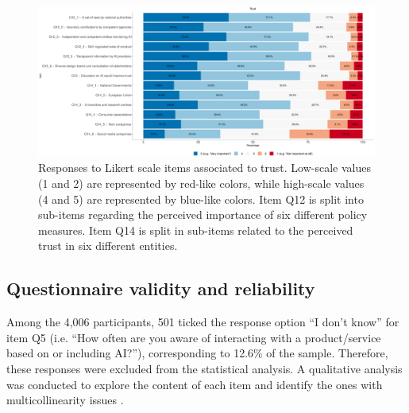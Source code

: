 \documentclass{article}
\begin{document}
\begin{figure}[!ht]
\centering
\includegraphics[width=\linewidth]{Fig3.eps}
\caption{Responses to Likert scale items associated to trust. Low-scale values (1 and 2) are represented by red-like colors, while high-scale values (4 and 5) are represented by blue-like colors. Item Q12 is split into sub-items regarding the perceived importance of six different policy measures. Item Q14 is split in sub-items related to the perceived trust in six different entities. 
}
\label{Fig_3}
\end{figure}

\subsection{Questionnaire validity and reliability} %

Among the 4,006 participants, 501 ticked the response option ``I don't know'' for item Q5 (i.e. ``How often are you aware of interacting with a product/service based on or including AI?''), corresponding to 12.6\% of the sample. Therefore, these responses were excluded from the statistical analysis. A qualitative analysis was conducted to explore the content of each item and identify the ones with multicollinearity issues \cite{cohen2017,joreskog1994}.
\end{document}
